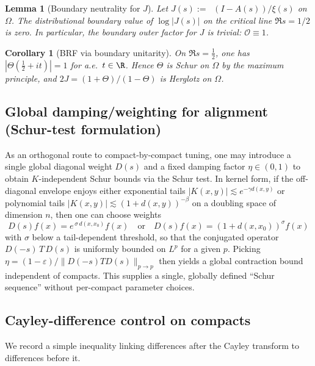 \documentclass[11pt]{article}
\newtheorem{lemma}[theorem]{Lemma}
\newtheorem{corollary}[theorem]{Corollary}
\theoremstyle{remark}
\DeclareMathOperator{\dettwo}{det_2}
\begin{document}
\begin{lemma}[Boundary neutrality for $J$]\label{lem:boundary-neutrality}
Let $J(s):=\dettwo(I-A(s))/\xi(s)$ on $\Omega$. The distributional boundary value of $\log|J(s)|$ on the critical line $\Re s = 1/2$ is zero. In particular, the boundary outer factor for $J$ is trivial: $\mathcal O\equiv 1$.
\end{lemma}

\begin{corollary}[BRF via boundary unitarity]\label{cor:boundary-BRF}
On $\Re s=\tfrac12$, one has $|\Theta(\tfrac12+it)|=1$ for a.e.~$t\in\R$. Hence $\Theta$ is Schur on $\Omega$ by the maximum principle, and $2J=(1+\Theta)/(1-\Theta)$ is Herglotz on $\Omega$.
\end{corollary}

\subsection{Global damping/weighting for alignment (Schur-test formulation)}\label{subsec:global-damping}
As an orthogonal route to compact-by-compact tuning, one may introduce a single global diagonal weight $D(s)$ and a fixed damping factor $\eta\in(0,1)$ to obtain $K$-independent Schur bounds via the Schur test. In kernel form, if the off-diagonal envelope enjoys either exponential tails $|K(x,y)|\lesssim e^{-\gamma d(x,y)}$ or polynomial tails $|K(x,y)|\lesssim (1+d(x,y))^{-\beta}$ on a doubling space of dimension $n$, then one can choose weights
\[
 D(s)f(x)=e^{\,\sigma\,d(x,x_0)}f(x)\quad\text{or}\quad D(s)f(x)=(1+d(x,x_0))^{\sigma} f(x)
\]
with $\sigma$ below a tail-dependent threshold, so that the conjugated operator $D(-s)\,T\,D(s)$ is uniformly bounded on $L^p$ for a given $p$. Picking $\eta=(1-\varepsilon)/\|D(-s)TD(s)\|_{p\to p}$ then yields a global contraction bound independent of compacts. This supplies a single, globally defined “Schur sequence” without per-compact parameter choices.

\subsection{Cayley-difference control on compacts}\label{subsec:Cayley-difference}
We record a simple inequality linking differences after the Cayley transform to differences before it.
\end{document}
